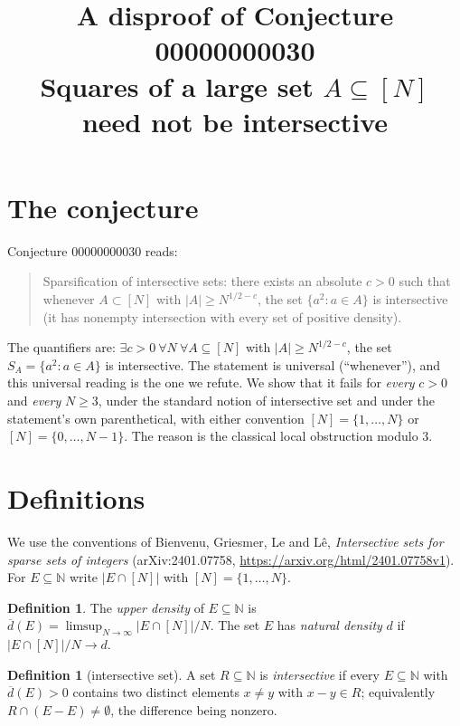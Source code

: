 \documentclass[11pt]{article}
\title{A disproof of Conjecture 00000000030\\[2pt]
\large Squares of a large set $A\subseteq[N]$ need not be intersective}
\date{}
\theoremstyle{definition}
\newtheorem{definition}[theorem]{Definition}
\theoremstyle{remark}
\renewcommand{\_}{\oldus\allowbreak}
\newcommand{\N}{\mathbb{N}}
\newcommand{\dbar}{\overline{d}}
\begin{document}
\sloppy
\maketitle

\section{The conjecture}

Conjecture 00000000030 reads:

\begin{quote}
Sparsification of intersective sets: there exists an absolute $c>0$ such that whenever $A\subset[N]$ with
$|A|\ge N^{1/2-c}$, the set $\{a^2 : a\in A\}$ is intersective (it has nonempty intersection with every set
of positive density).
\end{quote}

\noindent The quantifiers are: $\exists c>0\ \forall N\ \forall A\subseteq[N]$ with $|A|\ge N^{1/2-c}$,
the set $S_A=\{a^2:a\in A\}$ is intersective. The statement is universal (``whenever''), and this
universal reading is the one we refute. We show that it fails for \emph{every} $c>0$ and
\emph{every} $N\ge 3$, under the standard notion of intersective set and under the statement's own
parenthetical, with either convention $[N]=\{1,\dots,N\}$ or $[N]=\{0,\dots,N-1\}$. The reason is the
classical local obstruction modulo $3$.

\section{Definitions}

We use the conventions of Bienvenu, Griesmer, Le and L\^e, \emph{Intersective sets for sparse sets of
integers} (arXiv:2401.07758, \url{https://arxiv.org/html/2401.07758v1}). For $E\subseteq\N$ write
$|E\cap[N]|$ with $[N]=\{1,\dots,N\}$.

\begin{definition}
The \emph{upper density} of $E\subseteq\N$ is $\dbar(E)=\limsup_{N\to\infty}|E\cap[N]|/N$. The set $E$ has
\emph{natural density} $d$ if $|E\cap[N]|/N\to d$.
\end{definition}

\begin{definition}[intersective set]\label{def:int}
A set $R\subseteq\N$ is \emph{intersective} if every $E\subseteq\N$ with $\dbar(E)>0$ contains two
distinct elements $x\ne y$ with $x-y\in R$; equivalently $R\cap(E-E)\neq\emptyset$, the difference
being nonzero.
\end{definition}
\end{document}
